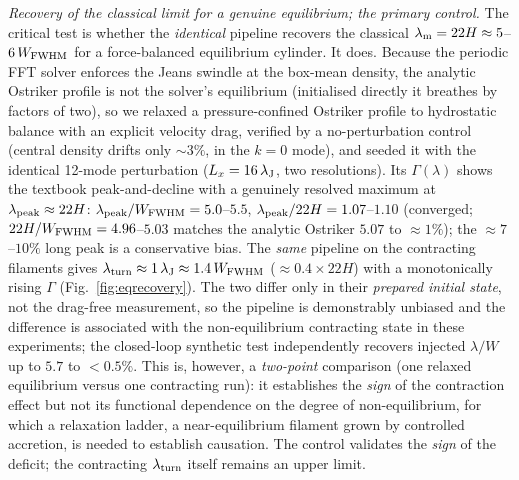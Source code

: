 \documentclass[usenatbib,twoside,twocolumn]{mnras}
\begin{document}
\emph{Recovery of the classical limit for a genuine equilibrium; the primary control.} The critical test is whether the \emph{identical} pipeline recovers the classical $\lambda_{\rm m}=22H\approx5$--$6\,W_{\rm FWHM}$ for a force-balanced equilibrium cylinder. It does. Because the periodic FFT solver enforces the Jeans swindle at the box-mean density, the analytic Ostriker profile is not the solver's equilibrium (initialised directly it breathes by factors of two), so we relaxed a pressure-confined Ostriker profile to hydrostatic balance with an explicit velocity drag, verified by a no-perturbation control (central density drifts only $\sim3\%$, in the $k=0$ mode), and seeded it with the identical 12-mode perturbation ($L_x=16\,\lambda_{\rm J}$, two resolutions). Its $\Gamma(\lambda)$ shows the textbook peak-and-decline with a genuinely resolved maximum at $\lambda_{\rm peak}\approx22H$: $\lambda_{\rm peak}/W_{\rm FWHM}=5.0$--$5.5$, $\lambda_{\rm peak}/22H=1.07$--$1.10$ (converged; $22H/W_{\rm FWHM}=4.96$--$5.03$ matches the analytic Ostriker $5.07$ to $\approx1\%$); the $\approx7$--$10\%$ long peak is a conservative bias. The \emph{same} pipeline on the contracting filaments gives $\lambda_{\rm turn}\approx1\,\lambda_{\rm J}\approx1.4\,W_{\rm FWHM}$ ($\approx0.4\times22H$) with a monotonically rising $\Gamma$ (Fig.~\ref{fig:eqrecovery}). The two differ only in their \emph{prepared initial state}, not the drag-free measurement, so the pipeline is demonstrably unbiased and the difference is associated with the non-equilibrium contracting state in these experiments; the closed-loop synthetic test independently recovers injected $\lambda/W$ up to $5.7$ to $<0.5\%$. This is, however, a \emph{two-point} comparison (one relaxed equilibrium versus one contracting run): it establishes the \emph{sign} of the contraction effect but not its functional dependence on the degree of non-equilibrium, for which a relaxation ladder, a near-equilibrium filament grown by controlled accretion, is needed to establish causation. The control validates the \emph{sign} of the deficit; the contracting $\lambda_{\rm turn}$ itself remains an upper limit.
\end{document}
